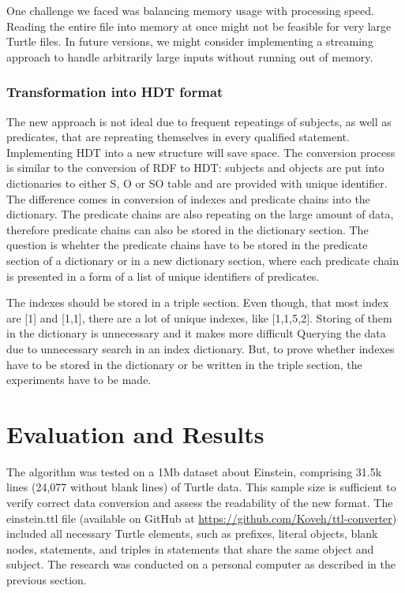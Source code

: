 One challenge we faced was balancing memory usage with processing speed. Reading the entire file into memory at once might not be feasible for very large Turtle files. In future versions, we might consider implementing a streaming approach to handle arbitrarily large inputs without running out of memory.

\subsubsection{Transformation into HDT format}
The new approach is not ideal due to frequent repeatings of subjects, as well as predicates, that are repreating themselves in every qualified statement. Implementing HDT into a new structure will save space. The conversion process is similar to the conversion of RDF to HDT: subjects and objects are put into dictionaries to either S, O or SO table and are provided with unique identifier. The difference comes in conversion of indexes and predicate chains into the dictionary. The predicate chains are also repeating on the large amount of data, therefore predicate chains can also be stored in the dictionary section. The question is whehter the predicate chains have to be stored in the predicate section of a dictionary or in a new dictionary section, where each predicate chain is presented in a form of a list of unique identifiers of predicates. 

The indexes should be stored in a triple section. Even though, that most index are [1] and [1,1], there are a lot of unique indexes, like [1,1,5,2]. Storing of them in the dictionary is unnecessary and it makes more difficult Querying the data due to unnecessary search in an index dictionary. But, to prove whether indexes have to be stored in the dictionary or be written in the triple section, the experiments have to be made.

\section{Evaluation and Results}

The algorithm was tested on a 1Mb dataset about Einstein, comprising 31.5k lines (24,077 without blank lines) of Turtle data. This sample size is sufficient to verify correct data conversion and assess the readability of the new format. The einstein.ttl file (available on GitHub at \url{https://github.com/Koveh/ttl-converter}) included all necessary Turtle elements, such as prefixes, literal objects, blank nodes, statements, and triples in statements that share the same object and subject. The research was conducted on a personal computer as described in the previous section.

